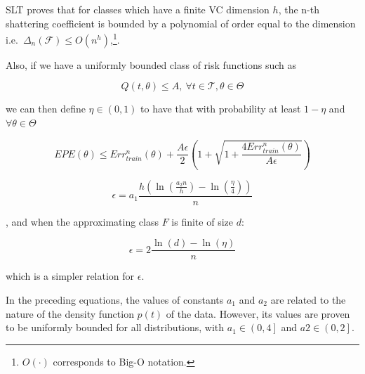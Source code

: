 \begin{appendices}
SLT proves that for classes which have a finite VC dimension $h$, the n-th shattering coefficient is bounded by a polynomial of order equal to the dimension
i.e.\ $\Delta_n(\mathcal {F}) \leq O(n^{h})$,\footnote{$O(\cdot)$ corresponds to Big-O notation.}.


Also, if we have a uniformly bounded class of risk functions such as 

\begin{equation}
Q(t,\theta) \leq A,  \ \forall t \in \mathcal {T}, \theta \in \Theta
\end{equation}

we can then define $\eta \in (0,1)$ to have that with probability at least $1 - \eta$ and $\forall \theta \in \Theta$

\begin{equation}
EPE(\theta) \leq Err^n_{train}(\theta) + \frac{A \epsilon}{2} \left(1 + \sqrt{1 + \frac{4 Err^n_{train}(\theta) }{A \epsilon}} \right)
\end{equation}\label{eq:vapnik-classificationBound}



\begin{equation}
\epsilon = a_1 \frac{h \left( \ln(\frac{a_2 n}{h} ) - \ln(\frac{\eta}{4} ) \right)}{n}
\end{equation}\label{eq:vapnik-epsilonBound}

, and when the approximating class $F$ is finite of size $d$:

\begin{equation}
\epsilon = 2 \frac{ \ln(d) - \ln(\eta)}{n}
\end{equation}\label{eq:vapnik-epsilonBoundSimple}


which is a simpler relation for $\epsilon$.

In the preceding equations, the values of constants $a_1$ and $a_2$ are related to the nature of the density function $p(t)$ of the data.
However, its values are proven to be uniformly bounded for all distributions, with $a_1 \in {\left(0,4 \right] }$ and $a2 \in {\left(0,2 \right]}$.


\end{appendices}
